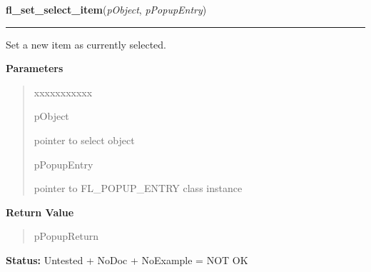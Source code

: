 \hspace{.8\funcindent}\begin{boxedminipage}{\funcwidth}

    \raggedright \textbf{fl\_set\_select\_item}(\textit{pObject}, \textit{pPopupEntry})

    \vspace{-1.5ex}

    \rule{\textwidth}{0.5\fboxrule}
\setlength{\parskip}{2ex}
    Set a new item as currently selected.

\setlength{\parskip}{1ex}
      \textbf{Parameters}
      \vspace{-1ex}

      \begin{quote}
        \begin{Ventry}{xxxxxxxxxxx}

          \item[pObject]

          pointer to select object

          \item[pPopupEntry]

          pointer to FL\_POPUP\_ENTRY class instance

        \end{Ventry}

      \end{quote}

      \textbf{Return Value}
    \vspace{-1ex}

      \begin{quote}
      pPopupReturn

      \end{quote}

\textbf{Status:} Untested + NoDoc + NoExample = NOT OK



    \end{boxedminipage}

    \label{xformslib:library:fl_get_select_item_by_value}

    \vspace{0.5ex}

